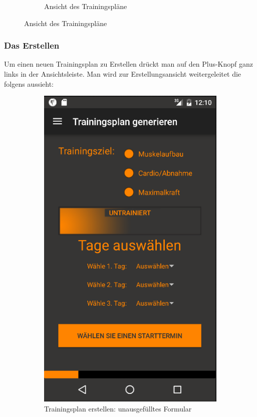 \documentclass[FIPLY_base.tex]{subfiles}
\begin{document}
\begin{figure}[H]
\begin{subfigure}[b]{0.4\textwidth}
		 		\caption{Ansicht des Trainingspläne}
		 	\end{subfigure}
		 \end{figure}
	\newpage
	\subsubsection{Das Erstellen}
	Um einen neuen Trainingsplan zu Erstellen drückt man auf den Plus-Knopf ganz links in der Ansichtsleiste. Man wird zur Erstellungsansicht weitergeleitet die folgens aussieht:
	\begin{figure}[H]
		\begin{subfigure}[b]{0.5\textwidth}
			\includegraphics[scale=0.5]{img/generieren1}
			\caption{Trainingsplan erstellen: unausgefülltes Formular}
		\end{subfigure}
		\begin{subfigure}[b]{0.5\textwidth}

\end{subfigure}
\end{figure}
\end{document}

